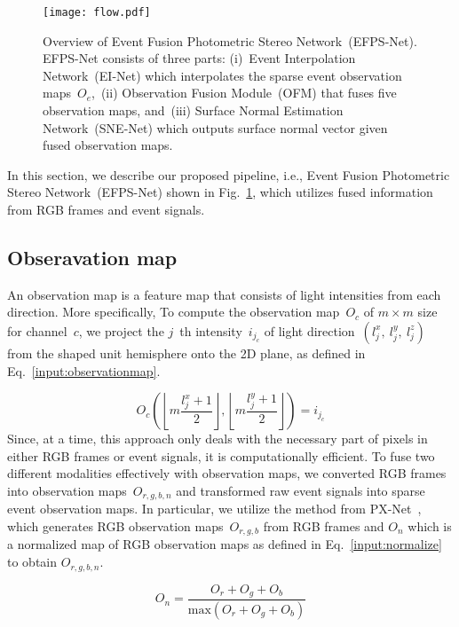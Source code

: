 \begin{figure}[t]
    \centering
    \texttt{[image: flow.pdf]}
    \caption{Overview of Event Fusion Photometric Stereo Network~(EFPS-Net). EFPS-Net consists of three parts: (i)~Event Interpolation Network~(EI-Net) which interpolates the sparse event observation maps~$O_{e}$,~(ii) Observation Fusion Module~(OFM) that fuses five observation maps, and~(iii) Surface Normal Estimation Network~(SNE-Net) which outputs surface normal vector given fused observation maps.}
    \label{fig:modelarchitecture}
\end{figure}
In this section, we describe our proposed pipeline, i.e., Event Fusion Photometric Stereo Network~(EFPS-Net) shown in Fig.~\ref{fig:modelarchitecture}, which utilizes fused information from RGB frames and event signals.

\subsection{Obseravation map}
An observation map is a feature map that consists of light intensities from each direction.
More specifically, To compute the observation map~$O_{c}$ of ${m\times m}$ size for channel~$c$, we project the $j$~th intensity~$i_{j_{c}}$ of light direction~$(l^{x}_{j},~l^{y}_{j},~l^{z}_{j})$ from the shaped unit hemisphere onto the 2D plane, as defined in Eq.~\ref{input:observationmap}.

\begin{equation}
O_{c}\left( \left \lfloor m\frac{l^{x}_{j}+1}{2}\right \rfloor,\left \lfloor m\frac{l^{y}_{j}+1}{2}\right \rfloor \right) = i_{j_{c}}
\label{input:observationmap}
\end{equation}
Since, at a time, this approach only deals with the necessary part of pixels in either RGB frames or event signals, it is computationally efficient. To fuse two different modalities effectively with observation maps, we converted RGB frames into observation maps~$O_{r,g,b,n}$ and transformed raw event signals into sparse event observation maps.  
In particular, we utilize the method from PX-Net~\citep{logothetis2021px}, which generates RGB observation maps~$O_{r,g,b}$ from RGB frames and $O_{n}$ which is a normalized map of RGB observation maps as defined in Eq.~\ref{input:normalize} to obtain $O_{r,g,b,n}$.


\begin{equation}
O_{n} = \frac{O_{r} + O_{g} + O_{b}}{\text{max}(O_{r} + O_{g} + O_{b})}
\label{input:normalize}
\end{equation}

